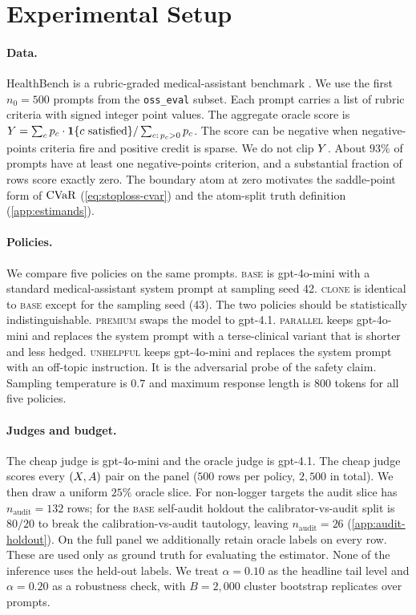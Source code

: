 \section{Experimental Setup}
\label{sec:setup}

\paragraph{Data.}
HealthBench is a rubric-graded medical-assistant benchmark
\citep{OpenAI2025HealthBench}. We use the first $n_0 = 500$ prompts
from the \texttt{oss\_eval} subset. Each prompt carries a list of
rubric criteria with signed integer point values. The aggregate oracle
score is $Y = \sum_c p_c \cdot \mathbf{1}\{c\text{ satisfied}\} /
\sum_{c:\,p_c>0} p_c$. The score can be negative when negative-points
criteria fire and positive credit is sparse. We do not clip $Y$. About
$93\%$ of prompts have at least one negative-points criterion, and a
substantial fraction of rows score exactly zero. The boundary atom at
zero motivates the saddle-point form of $\mathrm{CVaR}$ (\cref{eq:stoploss-cvar})
and the atom-split truth definition (\cref{app:estimands}).

\paragraph{Policies.}
We compare five policies on the same prompts. \textsc{base} is
gpt-4o-mini with a standard medical-assistant system prompt at sampling
seed 42. \textsc{clone} is identical to \textsc{base} except for the
sampling seed (43). The two policies should be statistically
indistinguishable. \textsc{premium} swaps the model to gpt-4.1.
\textsc{parallel} keeps gpt-4o-mini and replaces the system prompt
with a terse-clinical variant that is shorter and less hedged.
\textsc{unhelpful} keeps gpt-4o-mini and replaces the system prompt
with an off-topic instruction. It is the adversarial probe of the
safety claim. Sampling temperature is $0.7$ and maximum response length
is $800$ tokens for all five policies.

\paragraph{Judges and budget.}
The cheap judge is gpt-4o-mini and the oracle judge is gpt-4.1. The
cheap judge scores every $(X, A)$ pair on the panel ($500$ rows per
policy, $2{,}500$ in total). We then draw a uniform $25\%$ oracle slice.
For non-logger targets the audit slice has $n_{\mathrm{audit}} = 132$
rows; for the \textsc{base} self-audit holdout the calibrator-vs-audit
split is $80/20$ to break the calibration-vs-audit tautology, leaving
$n_{\mathrm{audit}} = 26$ (\cref{app:audit-holdout}). On the full panel
we additionally retain oracle labels on every row. These are used only
as ground truth for evaluating the estimator. None of the inference
uses the held-out labels. We treat $\alpha = 0.10$ as the headline tail
level and $\alpha = 0.20$ as a robustness check, with $B = 2{,}000$
cluster bootstrap replicates over prompts.

